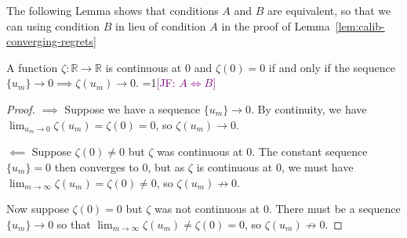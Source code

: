 \documentclass[anon,12pt]{colt2021} %
\newcommand{\Comments}{1}
\newcommand{\mynote}[2]{\ifnum\Comments=1\textcolor{#1}{#2}\fi}
\newcommand{\jessie}[1]{\mynote{purple}{[JF: #1]}}
\newcommand{\reals}{\mathbb{R}}
\begin{document}
The following Lemma shows that conditions $A$ and $B$ are equivalent, so that we can using condition $B$ in lieu of condition $A$ in the proof of Lemma~\ref{lem:calib-converging-regrets}
\begin{lemma}\label{lem:continuous-iff-limits}
	A function $\zeta:\reals \to \reals$ is continuous at $0$ and $\zeta(0) = 0$ if and only if the sequence $\{u_m\} \to 0 \implies \zeta(u_m) \to 0$.
	\jessie{$A \iff B$}
\end{lemma}
\begin{proof}
	$\implies$ Suppose we have a sequence $\{u_m\} \to 0$.
	By continuity, we have $\lim_{u_m \to 0}\zeta(u_m) = \zeta(0) = 0$, so $\zeta(u_m) \to 0$.
	
	$\impliedby$ Suppose $\zeta(0) \neq 0$ but $\zeta$ was continuous at $0$.
	The constant sequence $\{u_m\} = 0$ then converges to $0$, but as $\zeta$ is continuous at $0$, we must have $\lim_{m \to \infty}\zeta(u_m) = \zeta(0) \neq 0$, so $\zeta(u_m) \not \to 0$.
	
	Now suppose $\zeta(0) = 0$ but $\zeta$ was not continuous at $0$.
	There must be a sequence $\{u_m\} \to 0$ so that $\lim_{m \to \infty}\zeta(u_m) \neq \zeta(0) = 0$, so $\zeta(u_m) \not \to 0$.
\end{proof}
\end{document}
